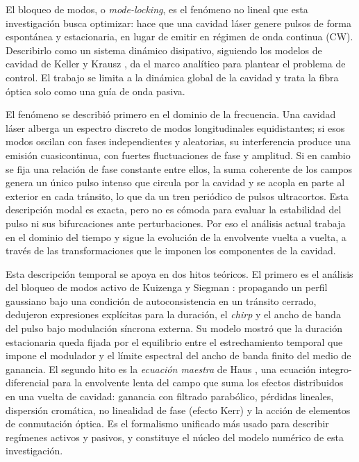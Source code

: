 El bloqueo de modos, o \emph{mode-locking}, es el fenómeno no lineal que esta investigación busca optimizar: hace que una cavidad láser genere pulsos de forma espontánea y estacionaria, en lugar de emitir en régimen de onda continua (CW). Describirlo como un sistema dinámico disipativo, siguiendo los modelos de cavidad de Keller y Krausz \cite{Krausz1992,Keller2022}, da el marco analítico para plantear el problema de control. El trabajo se limita a la dinámica global de la cavidad y trata la fibra óptica solo como una guía de onda pasiva.

El fenómeno se describió primero en el dominio de la frecuencia. Una cavidad láser alberga un espectro discreto de modos longitudinales equidistantes; si esos modos oscilan con fases independientes y aleatorias, su interferencia produce una emisión cuasicontinua, con fuertes fluctuaciones de fase y amplitud. Si en cambio se fija una relación de fase constante entre ellos, la suma coherente de los campos genera un único pulso intenso que circula por la cavidad y se acopla en parte al exterior en cada tránsito, lo que da un tren periódico de pulsos ultracortos. Esta descripción modal es exacta, pero no es cómoda para evaluar la estabilidad del pulso ni sus bifurcaciones ante perturbaciones. Por eso el análisis actual trabaja en el dominio del tiempo y sigue la evolución de la envolvente vuelta a vuelta, a través de las transformaciones que le imponen los componentes de la cavidad.

Esta descripción temporal se apoya en dos hitos teóricos. El primero es el análisis del bloqueo de modos activo de Kuizenga y Siegman \cite{KuizengaSiegman1970}: propagando un perfil gaussiano bajo una condición de autoconsistencia en un tránsito cerrado, dedujeron expresiones explícitas para la duración, el \emph{chirp} y el ancho de banda del pulso bajo modulación síncrona externa. Su modelo mostró que la duración estacionaria queda fijada por el equilibrio entre el estrechamiento temporal que impone el modulador y el límite espectral del ancho de banda finito del medio de ganancia. El segundo hito es la \emph{ecuación maestra} de Haus \cite{Haus1975fast,Haus2000}, una ecuación integro-diferencial para la envolvente lenta del campo que suma los efectos distribuidos en una vuelta de cavidad: ganancia con filtrado parabólico, pérdidas lineales, dispersión cromática, no linealidad de fase (efecto Kerr) y la acción de elementos de conmutación óptica. Es el formalismo unificado más usado para describir regímenes activos y pasivos, y constituye el núcleo del modelo numérico de esta investigación.

